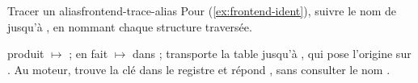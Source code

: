 \begin{exercice}{Tracer un alias}{frontend-trace-alias}
Pour  (\cref{ex:frontend-ident}), suivre le nom  de  jusqu'à , en nommant chaque structure traversée.
\end{exercice}
\begin{solution}
 produit  $\mapsto$  ;  en fait  $\mapsto$  dans  ;  transporte la table jusqu'à , qui pose l'origine sur . Au moteur,  trouve la clé  dans le registre et répond , sans consulter le nom .
\end{solution}
